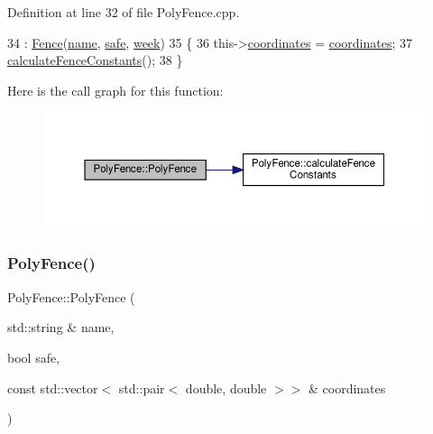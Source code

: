 Definition at line 32 of file Poly\+Fence.\+cpp.


\begin{DoxyCode}
34         : \hyperlink{class_fence_a5c2be718e885ed9ae2ca048406d126b3}{Fence}(\hyperlink{class_fence_aa405676733f25812b38ea0dd9ccd1863}{name}, \hyperlink{class_fence_ad570430040eee657c625a67d5589c4b5}{safe}, \hyperlink{class_fence_ae589e973fa03316847aeceedd72e2b64}{week})
35 \{
36     this->\hyperlink{class_poly_fence_ae8e0c55e745979cab104ef80aeb4b418}{coordinates} = \hyperlink{class_poly_fence_ae8e0c55e745979cab104ef80aeb4b418}{coordinates};
37     \hyperlink{class_poly_fence_a229de6f5987bf7d312310b522db0d5a4}{calculateFenceConstants}();
38 \}
\end{DoxyCode}
Here is the call graph for this function\+:\nopagebreak
\begin{figure}[H]
\begin{center}
\leavevmode
\includegraphics[width=350pt]{d1/d22/class_poly_fence_a651e57a18ef757b31b5f6b54f7e081b9_cgraph}
\end{center}
\end{figure}
\mbox{\label{class_poly_fence_a8468093f83237de375992d099727b93d}} 
\subsubsection{\texorpdfstring{Poly\+Fence()}{PolyFence()}\hspace{0.1cm}{\footnotesize\ttfamily [2/3]}}
{\footnotesize\ttfamily Poly\+Fence\+::\+Poly\+Fence (\begin{DoxyParamCaption}\item[{std\+::string \&}]{name,  }\item[{bool}]{safe,  }\item[{const std\+::vector$<$ std\+::pair$<$ double, double $>$$>$ \&}]{coordinates }\end{DoxyParamCaption})}



